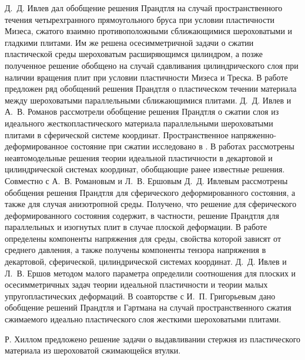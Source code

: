 Д.~Д. Ивлев \autocite{Ivlev:1958a} дал обобщение решения Прандтля на случай пространственного течения четырехгранного прямоугольного бруса при условии пластичности Мизеса, сжатого взаимно противоположными сближающимися шероховатыми и гладкими плитами. Им же \autocite{Ivlev:1958b} решена осесимметричной задачи о сжатии пластической среды шероховатым расширяющимся цилиндром, а позже \autocite{Ivlev:1958c,Ivlev:1959} полученное решение обобщено на случай сдавливания цилиндрического слоя при наличии вращения плит при условии пластичности Мизеса и Треска.
В работе \autocite{Ivlev:1973} предложен ряд обобщений решения Прандтля о пластическом течении материала между шероховатыми параллельными сближающимися плитами.
Д.~Д. Ивлев и А.~В. Романов \autocite{Ivlev:1982} рассмотрели обобщение решения Прандтля о сжатии слоя из идеального жесткопластического материала параллельными шероховатыми плитами в сферической системе координат.
Пространственное напряженно-деформированное состояние при сжатии исследовано в \autocite{Ivlev:1998}.
В работах \autocite{Ivlev:1984a,Ivlev:1984b} рассмотрены неавтомодельные решения теории идеальной пластичности в декартовой и цилиндрической системах координат, обобщающие ранее известные решения. Совместно с А.~В. Романовым и Л.~В. Ершовым \autocite{Ershov:1982} Д.~Д. Ивлевым рассмотрены обобщения решения Прандтля для сферического деформированного состояния, а также для случая анизотропной среды. Получено, что решение для сферического деформированного состояния содержит, в частности, решение Прандтля для параллельных и изогнутых плит в случае плоской деформации. В работе \autocite{Ivlev:1966} определены компоненты напряжения для среды, свойства которой зависят от среднего давления, а также получены компоненты тензора напряжения в декартовой, сферической, цилиндрической системах координат.
Д.~Д. Ивлев и Л.~В. Ершов \autocite{Ivlev:1978} методом малого параметра определили соотношения для плоских и осесимметричных задач теории идеальной пластичности и теории малых упругопластических деформаций.
В соавторстве с И.~П. Григорьевым \autocite{Ivlev:2000} дано обобщение решений Прандтля и Гартмана на случай пространственного сжатия сжимаемого идеально пластического слоя жесткими шероховатыми плитами.

Р. Хиллом \autocite{Hill:1956} предложено решение задачи о выдавливании стержня из пластического материала из шероховатой сжимающейся втулки.


